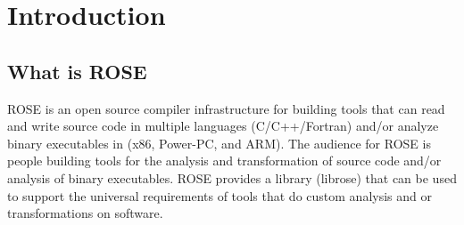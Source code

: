 \chapter{ Introduction }

\label{introduction:introduction}





\section{What is ROSE}

%       
% 
   ROSE is an open source compiler infrastructure for building tools that can
read and write source code in multiple languages (C/C++/Fortran)
and/or analyze binary executables in (x86, Power-PC, and ARM).
The audience for ROSE is people building tools for the analysis
and transformation of source code and/or analysis of binary 
executables.  ROSE provides a library (librose) that can be 
used to support the universal requirements of tools that
do custom analysis and or transformations on software. 

